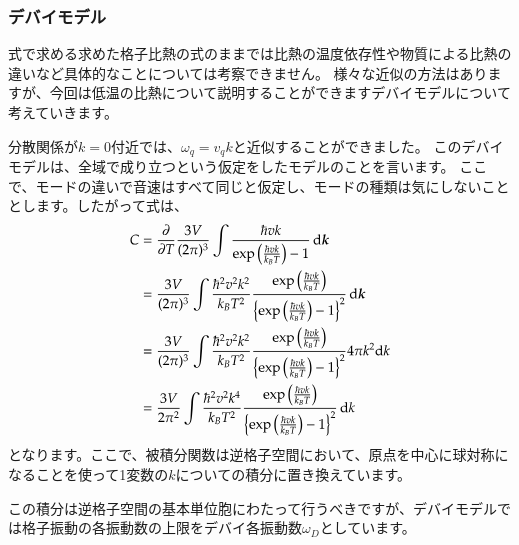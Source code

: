 \documentclass[10pt,b5paper,papersize,dvipdfmx]{jsbook}
\begin{document}
\subsubsection*{デバイモデル}
式で求める求めた格子比熱の式のままでは比熱の温度依存性や物質による比熱の違いなど具体的なことについては考察できません。
様々な近似の方法はありますが、今回は低温の比熱について説明することができますデバイモデルについて考えていきます。\par
分散関係が$k = 0$付近では、$\omega_q = v_q k$と近似することができました。
このデバイモデルは、全域で成り立つという仮定をしたモデルのことを言います。
ここで、モードの違いで音速はすべて同じと仮定し、モードの種類は気にしないこととします。したがって式は、
\begin{align}
  C &= \pdv{T} \frac{3V}{(2\pi)^3} \int\frac{\hbar v k}{\exp \left(\frac{\hbar v k}{k_BT}\right)-1 }\dd{\bm{k}} \notag\\
  & = \frac{3V}{(2\pi)^3} \int \frac{\hbar^2 v^2 k ^2}{k_B T ^2}  \frac{\exp \left(\frac{\hbar v k}{k_BT}\right)}{\left\{\exp \left(\frac{\hbar v k}{k_BT}\right)-1 \right\}^2}\dd{\bm{k}} \notag\\
  &= \frac{3V}{(2\pi)^3} \int \frac{\hbar^2 v^2 k ^2}{k_B T ^2}  \frac{\exp \left(\frac{\hbar v k}{k_BT}\right)}{\left\{\exp \left(\frac{\hbar v k}{k_BT}\right)-1 \right\}^2} 4 \pi k^2 \dd k \notag\\
  &= \frac{3V}{2\pi^2} \int \frac{\hbar^2 v^2 k ^4}{k_B T ^2}  \frac{\exp \left(\frac{\hbar v k}{k_BT}\right)}{\left\{\exp \left(\frac{\hbar v k}{k_BT}\right)-1 \right\}^2} \dd {k}
  \label{eq:daigakutoutyaku}
\end{align}
となります。ここで、被積分関数は逆格子空間において、原点を中心に球対称になることを使って1変数の$k$についての積分に置き換えています。\par
この積分は逆格子空間の基本単位胞にわたって行うべきですが、デバイモデルでは格子振動の各振動数の上限をデバイ各振動数$\omega_D$としています。
\end{document}
